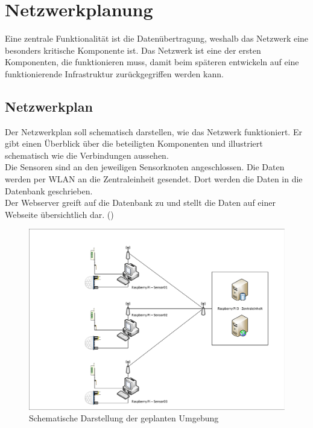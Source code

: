\section{Netzwerkplanung}
Eine zentrale Funktionalität ist die Datenübertragung, weshalb das Netzwerk eine besonders kritische Komponente ist. Das Netzwerk ist eine der ersten Komponenten, die funktionieren muss, damit beim späteren entwickeln auf eine funktionierende Infrastruktur zurückgegriffen werden kann.

\subsection{Netzwerkplan}
Der Netzwerkplan soll schematisch darstellen, wie das Netzwerk funktioniert. Er gibt einen Überblick über die beteiligten Komponenten und illustriert schematisch wie die Verbindungen aussehen.\\
Die Sensoren sind an den jeweiligen Sensorknoten angeschlossen. Die Daten werden per WLAN an die Zentraleinheit gesendet. Dort werden die Daten in die Datenbank
geschrieben.\\
Der Webserver greift auf die Datenbank zu und stellt die Daten auf einer Webseite
übersichtlich dar. ()
\begin{figure} [htb]
\begin{centering}
\includegraphics[scale=0.35]{Bilder/Kapitel3/Netzplan.pdf}
\caption[Schematische Darstellung der geplanten Umgebung]{Schematische
Darstellung der geplanten Umgebung}
\label{Darstellung_Umgebung}
\end{centering}
\end{figure} 

